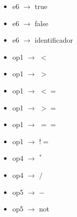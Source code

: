 \documentclass[11pt]{article}
\begin{document}
\begin{itemize}
                \item e6 $\rightarrow$ true
                \item e6 $\rightarrow$ false
                \item e6 $\rightarrow$ identificador
                \item op1 $\rightarrow$ $<$
                \item op1 $\rightarrow$ $>$
                \item op1 $\rightarrow$ $<=$
                \item op1 $\rightarrow$ $>=$
                \item op1 $\rightarrow$ $==$
                \item op1 $\rightarrow$ $!=$
                \item op4 $\rightarrow$ $^{\ast}$
                \item op4 $\rightarrow$ $/$
                \item op5 $\rightarrow$ $-$
                \item op5 $\rightarrow$ not
            \end{itemize}
\end{document}
